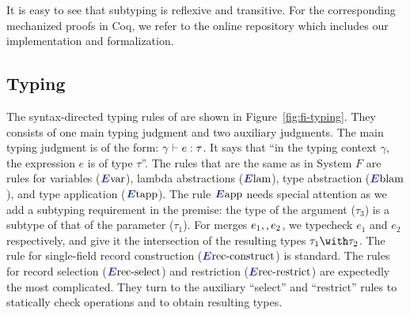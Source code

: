 
It is easy to see that subtyping is reflexive and transitive. For the
corresponding mechanized proofs in Coq, we refer to the online 
repository which includes our implementation and formalization.

\subsection{Typing}

\begin{figure*}
  \small
  
  \caption{The type system of \name.}
  \label{fig:fi-typing}
\end{figure*}

The syntax-directed typing rules of \name are shown in Figure~\ref{fig:fi-typing}. They consists of one
main typing judgment and two auxiliary judgments. The main typing judgment is of
the form: $ \judgee \gamma e \tau $. It says that ``in the typing context
$\gamma$, the expression $e$ is of type $\tau$''. The rules that are the same as
in System $F$ are rules for variables ($\rulelabelevar$), lambda abstractions
($\rulelabelelam$), type abstraction ($\rulelabeleblam$), and type application
($\rulelabeletapp$). The rule $\rulelabeleapp$ needs special attention as we add
a subtyping requirement in the premise: the type of the argument ($\tau_3$) is a
subtype of that of the parameter ($\tau_1$). 
For merges
$e_1 ,, e_2$, we typecheck $e_1$ and $e_2$ respectively, and give it the
intersection of the resulting types $\tau_1 \andop \tau_2$. The rule for
single-field record construction ($\rulelabelereccon$) is standard. The rules
for record selection ($\rulelabelerecselect$) and restriction
($\rulelabelerecrestrict$) are expectedly the most complicated. They turn to the
auxiliary ``select'' and ``restrict'' rules to statically check operations and
to obtain resulting types.

